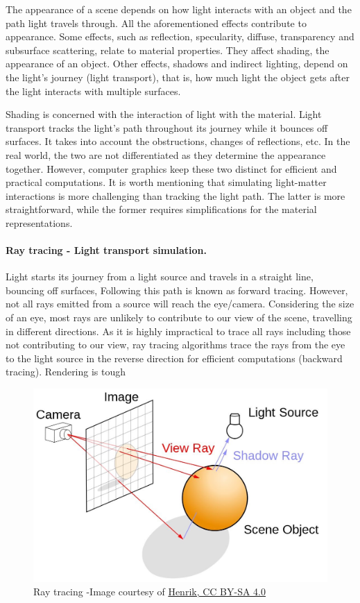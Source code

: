 The appearance of a scene depends on how light interacts with an object and the path light travels through. All the aforementioned effects contribute to appearance. Some effects, such as reflection, specularity, diffuse, transparency and subsurface scattering, relate to material properties. They affect shading, the appearance of an object. Other effects, shadows and indirect lighting, depend on the light's journey (light transport), that is, how much light the object gets after the light interacts with multiple surfaces. 

Shading is concerned with the interaction of light with the material. Light transport tracks the light's path throughout its journey while it bounces off surfaces. It takes into account the obstructions, changes of reflections, etc. In the real world, the two are not differentiated as they determine the appearance together. However, computer graphics keep these two distinct for efficient and practical computations. It is worth mentioning that simulating light-matter interactions is more challenging than tracking the light path. The latter is more straightforward, while the former requires simplifications for the material representations.



\paragraph{Ray tracing - Light transport simulation.}

Light starts its journey from a light source and travels in a straight line, bouncing off surfaces, Following this path is known as forward tracing. However, not all rays emitted from a source will reach the eye/camera. Considering the size of an eye, most rays are unlikely to contribute to our view of the scene, travelling in different directions. As it is highly impractical to trace all rays including those not contributing to our view, ray tracing algorithms trace the rays from the eye to the light source in the reverse direction for efficient computations (backward tracing). 
Rendering is tough



\begin{figure}[h]
  \centering
   \includegraphics[width=0.5\linewidth]{Images/ray-tracing-image-1.jpg}
   \caption{Ray tracing -Image courtesy of \href{https://commons.wikimedia.org/wiki/File:Ray_trace_diagram.svg}{Henrik, CC BY-SA 4.0}}
   \label{fig:raytracing}
\end{figure}




